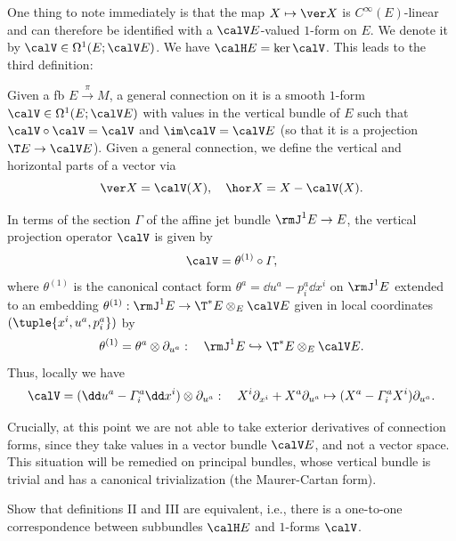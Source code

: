 One thing to note immediately is that the map $X\mapsto \ver X$ is  $C^\infty(E)$-linear and can therefore be identified with a $\calV E$-valued $1$-form on $E$. We denote it by $\calV\in\Omega^1(E;\calV E)$. We have $\calH E=\ker \calV$. This leads to the third definition:

\begin{defn}
    Given a \gls{fb} $E\overset{\pi}{\to}M$, a general connection on it is a smooth $1$-form $\calV\in\Omega^1(E;\calV E)$ with values in the vertical bundle of $E$ such that $\calV\circ\calV=\calV$ and $\im\calV=\calV E$ (so that it is a projection $\T E\to \calV E$). Given a general connection, we define the vertical and horizontal parts of a vector via
    \[\ver X=\calV(X),\quad \hor X=X-\calV(X).\]
\end{defn}

\begin{rem}\label{rem connections via jets 2}
    In terms of the section $\varGamma$ of the affine jet bundle $\rmJ^1 E\to E$, the vertical projection operator $\calV$ is given by 
    \[\calV=\theta^{(1)}\circ\varGamma,\]
    where $\theta^{(1)}$ is the canonical contact form $\theta^a=\dd u^a-p^a_i\dd x^i$ on $\rmJ^1 E$ extended to an embedding $\theta^{(1)}:\rmJ^1 E\to \T^\ast E\otimes_E \calV E$ given in local coordinates $(\tuple{x^i,u^a,p^a_i})$ by 
    \[\theta^{(1)}=\theta^a\otimes \partial_{u^a}:\quad \rmJ^1 E\hookrightarrow \T^\ast E\otimes_E \calV E.\] 
    Thus, locally we have 
    \[\calV=(\dd u^a-\varGamma^a_i\dd x^i)\otimes \partial_{u^a}:\quad X^i\partial_{x^i}+X^a\partial_{u^a}\mapsto (X^a-\varGamma^a_i X^i)\partial_{u^a}.\]
\end{rem}

\begin{rem}
    Crucially, at this point we are not able to take exterior derivatives of connection forms, since they take values in a vector bundle $\calV E$, and not a vector space. This situation will be remedied on principal bundles, whose vertical bundle is trivial and has a canonical trivialization (the Maurer-Cartan form).
\end{rem}

\begin{xca}
    Show that definitions II and III are equivalent, i.e., there is a one-to-one correspondence between subbundles $\calH E$ and $1$-forms $\calV$.
\end{xca}


